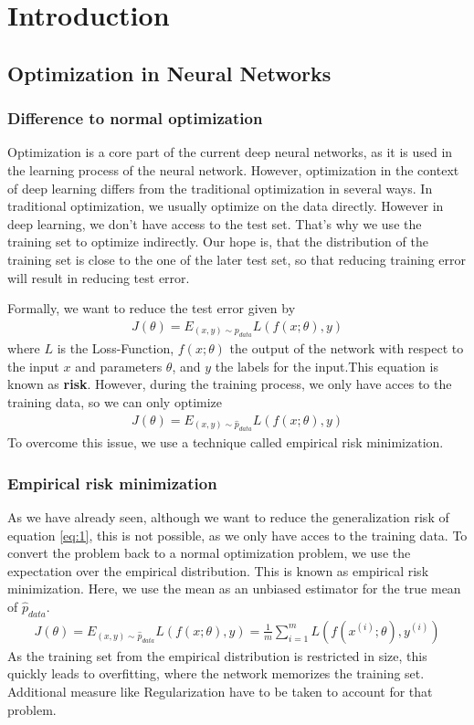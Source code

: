 \chapter{Introduction}
\section{Optimization in Neural Networks}
\subsection{Difference to normal optimization}\label{sub:1}
Optimization is a core part of the current deep neural networks, as it is used
in the learning process of the neural network. However, optimization in the
context of deep learning differs from the traditional optimization in several
ways. In traditional optimization, we usually optimize on the data directly.
However in deep learning, we don't have access to the test set. That's why we
use the training set to optimize indirectly. Our hope is, that the distribution
of the training set is close to the one of the later test set, so that reducing
training error will result in reducing test error.

Formally, we want to reduce the test error given by
\begin{align}\label{eq:1}
    J(\theta) = E_{(x,y)\sim p_{data}} L(f(x;\theta), y)
\end{align}
where $L$ is the Loss-Function, $f(x;\theta)$ the output of the network with
respect to the input $x$ and parameters $\theta$, and $y$ the labels for the
input.This equation is known as \textbf{risk}. However, during the training process, we
only have acces to the training data, so we can only optimize
\begin{align}
    J(\theta) = E_{(x,y)\sim \hat{p}_{data}} L(f(x;\theta), y)
\end{align}
To overcome this issue, we use a technique called empirical risk minimization.

\subsection{Empirical risk minimization}\label{sub:2}
As we have already seen, although we want to reduce the generalization risk of
equation \ref{eq:1}, this is not possible, as we only have acces to the training data.
To convert the problem back to a normal optimization problem, we use the
expectation over the empirical distribution. This is known as empirical risk
minimization. Here, we use the mean as an unbiased estimator for the true mean
of $\hat{p}_{data}$.
\begin{align}\label{eq:3}
    J(\theta) = E_{(x,y)\sim \hat{p}_{data}} L(f(x;\theta), y) = \frac{1}{m} \sum_{i=1}^m L(f(x^{(i)}; \theta), y^{(i)})
\end{align}
As the training set from the empirical distribution is restricted in size, this
quickly leads to overfitting, where the network memorizes the training set.
Additional measure like Regularization have to be taken to account for that
problem.

